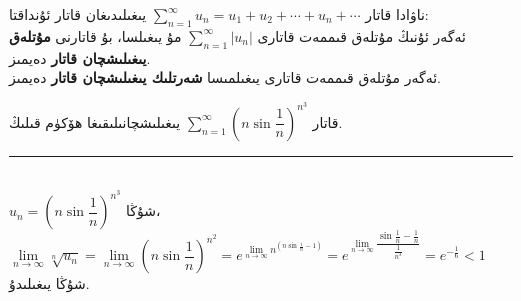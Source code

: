 \begin{colorful}[red]
ناۋادا قاتار
$\sum\limits_{n=1}^\infty u_n=u_1+u_2+\cdots+u_n+\cdots$
يىغىلىدىغان قاتار ئۇنداقتا:\\
ئەگەر ئۇنىڭ مۇتلەق قىممەت قاتارى
$\sum\limits_{n=1}^\infty |u_n|$
مۇ يىغىلسا، بۇ قاتارنى
\textbf{مۇتلەق يىغىلىشچان قاتار}
دەيمىز.\\
ئەگەر مۇتلەق قىممەت قاتارى يىغىلمىسا 
\textbf{شەرتلىك يىغىلىشچان قاتار}
دەيمىز.
\end{colorful}

\begin{myexample}
	قاتار
	$\sum\limits_{n=1}^\infty\left(n\sin\dfrac{1}{n}\right)^{n^3}$
	يىغىلىشچانىلىقىغا ھۆكۈم قىلىڭ.
	\\\rule{\linewidth}{0.05em}\\
	$u_n=\left(n\sin\dfrac{1}{n}\right)^{n^3}$
	شۇڭا،\\
	$\lim\limits_{n\to\infty}\sqrt[n]{u_n}=\lim\limits_{n\to\infty}\left(n\sin\dfrac{1}{n}\right)^{n^2}=e^{\lim\limits_{n\to\infty}n^(n\sin\frac{1}{n}-1)}=e^{\lim\limits_{n\to\infty}\dfrac{\sin\frac{1}{n}-\frac{1}{n}}{\frac{1}{n^3}}}=e^{-\frac{1}{6}}<1$\\
	شۇڭا يىغىلىدۇ.
\end{myexample}

